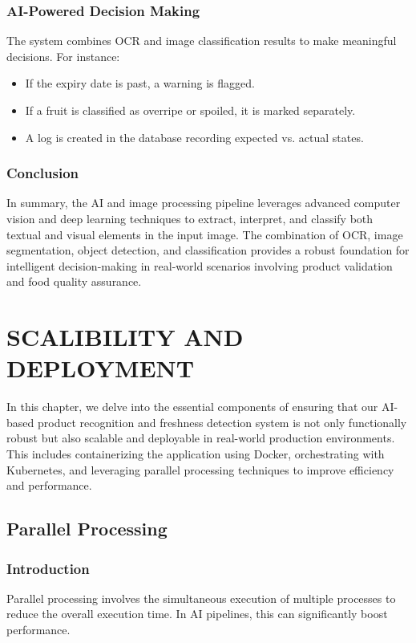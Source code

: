 \documentclass[12pt]{report}
\begin{document}
\subsection{AI-Powered Decision Making}
The system combines OCR and image classification results to make meaningful decisions. For instance:

\begin{itemize}
\item If the expiry date is past, a warning is flagged.
\item If a fruit is classified as overripe or spoiled, it is marked separately.
\item A log is created in the database recording expected vs. actual states.
\end{itemize}

\subsection{Conclusion}
In summary, the AI and image processing pipeline leverages advanced computer vision and deep learning techniques to extract, interpret, and classify both textual and visual elements in the input image. The combination of OCR, image segmentation, object detection, and classification provides a robust foundation for intelligent decision-making in real-world scenarios involving product validation and food quality assurance.


\newpage
\chapter{SCALIBILITY AND DEPLOYMENT}
 In this chapter, we delve into the essential components of ensuring that our AI-based product recognition and freshness detection system is not only functionally robust but also scalable and deployable in real-world production environments. This includes containerizing the application using Docker, orchestrating with Kubernetes, and leveraging parallel processing techniques to improve efficiency and performance.
\section{Parallel Processing}

\subsection{Introduction}
Parallel processing involves the simultaneous execution of multiple processes to reduce the overall execution time. In AI pipelines, this can significantly boost performance.
\end{document}
